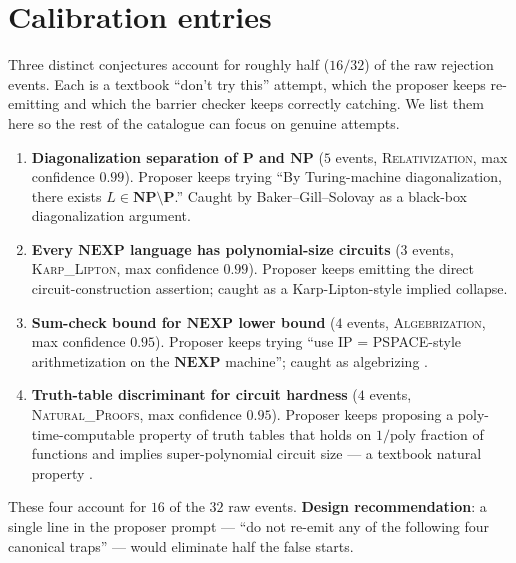 \documentclass[11pt,a4paper]{article}
\begin{document}
\section{Calibration entries}\label{sec:calibration}

Three distinct conjectures account for roughly half ($16/32$) of the
raw rejection events. Each is a textbook ``don't try this'' attempt,
which the proposer keeps re-emitting and which the barrier checker
keeps correctly catching. We list them here so the rest of the
catalogue can focus on genuine attempts.

\begin{enumerate}

\item \textbf{Diagonalization separation of $\mathbf{P}$ and $\mathbf{NP}$}
($5$ events, \textsc{Relativization}, max confidence $0.99$).
Proposer keeps trying ``By Turing-machine diagonalization, there exists
$L \in \mathbf{NP} \setminus \mathbf{P}$.'' Caught by Baker--Gill--Solovay
\cite{BakerGillSolovay1975} as a black-box diagonalization argument.

\item \textbf{Every $\mathbf{NEXP}$ language has polynomial-size circuits}
($3$ events, \textsc{Karp\_Lipton}, max confidence $0.99$).
Proposer keeps emitting the direct circuit-construction assertion;
caught as a Karp-Lipton-style implied collapse.

\item \textbf{Sum-check bound for $\mathbf{NEXP}$ lower bound}
($4$ events, \textsc{Algebrization}, max confidence $0.95$).
Proposer keeps trying ``use IP = PSPACE-style arithmetization on the
$\mathbf{NEXP}$ machine''; caught as algebrizing
\cite{AaronsonWigderson2008}.

\item \textbf{Truth-table discriminant for circuit hardness}
($4$ events, \textsc{Natural\_Proofs}, max confidence $0.95$).
Proposer keeps proposing a poly-time-computable property of truth
tables that holds on $1/\mathrm{poly}$ fraction of functions and
implies super-polynomial circuit size — a textbook natural property
\cite{RazborovRudich1997}.

\end{enumerate}

These four account for $16$ of the $32$ raw events. \textbf{Design
recommendation}: a single line in the proposer prompt — ``do not
re-emit any of the following four canonical traps'' — would eliminate
half the false starts.
\end{document}
